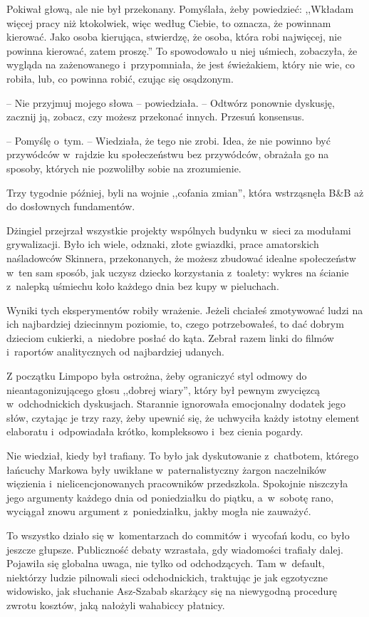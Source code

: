 \documentclass[oneside,polish,11pt,sfheadings]{mwbk}
\begin{document}
Pokiwał głową, ale nie był przekonany. Pomyślała, żeby powiedzieć:
,,Wkładam więcej pracy niż ktokolwiek, więc według Ciebie, to oznacza,
że powinnam kierować. Jako osoba kierująca, stwierdzę, że osoba, która
robi najwięcej, nie powinna kierować, zatem proszę.'' To spowodowało u
niej uśmiech, zobaczyła, że wygląda na zażenowanego i~przypomniała, że
jest świeżakiem, który nie wie, co robiła, lub, co powinna robić, czując
się osądzonym.

-- Nie przyjmuj mojego słowa -- powiedziała. -- Odtwórz ponownie dyskusję,
zacznij ją, zobacz, czy możesz przekonać innych. Przesuń konsensus.

-- Pomyślę o~tym. -- Wiedziała, że tego nie zrobi. Idea, że nie powinno
być przywódców w~rajdzie ku społeczeństwu bez przywódców, obrażała go na
sposoby, których nie pozwoliłby sobie na zrozumienie.

Trzy tygodnie później, byli na wojnie ,,cofania zmian'', która
wstrząsnęła B\&B aż do dosłownych fundamentów.

Dżingiel przejrzał wszystkie projekty wspólnych budynku w~sieci za
modułami grywalizacji. Było ich wiele, odznaki, złote gwiazdki, prace
amatorskich naśladowców Skinnera, przekonanych, że możesz zbudować
idealne społeczeństw w~ten sam sposób, jak uczysz dziecko korzystania z~toalety: wykres na ścianie z~nalepką uśmiechu koło każdego dnia bez kupy
w pieluchach.

Wyniki tych eksperymentów robiły wrażenie. Jeżeli chciałeś zmotywować
ludzi na ich najbardziej dziecinnym poziomie, to, czego potrzebowałeś,
to dać dobrym dzieciom cukierki, a~niedobre posłać do kąta. Zebrał razem
linki do filmów i~raportów analitycznych od najbardziej udanych.

Z początku Limpopo była ostrożna, żeby ograniczyć styl odmowy do
nieantagonizującego głosu ,,dobrej wiary'', który był pewnym zwycięzcą w~odchodnickich dyskusjach. Starannie ignorowała emocjonalny dodatek jego
słów, czytając je trzy razy, żeby upewnić się, że uchwyciła każdy
istotny element elaboratu i~odpowiadała krótko, kompleksowo i~bez cienia
pogardy.

Nie wiedział, kiedy był trafiany. To było jak dyskutowanie z~chatbotem,
którego łańcuchy Markowa były uwikłane w~paternalistyczny żargon
naczelników więzienia i~nielicencjonowanych pracowników przedszkola.
Spokojnie niszczyła jego argumenty każdego dnia od poniedziałku do
piątku, a~w~sobotę rano, wyciągał znowu argument z~poniedziałku, jakby
mogła nie zauważyć.

To wszystko działo się w~komentarzach do commitów i~wycofań kodu, co
było jeszcze głupsze. Publiczność debaty wzrastała, gdy wiadomości
trafiały dalej. Pojawiła się globalna uwaga, nie tylko od odchodzących.
Tam w~default, niektórzy ludzie pilnowali sieci odchodnickich, traktując
je jak egzotyczne widowisko, jak słuchanie Asz-Szabab skarżący się na
niewygodną procedurę zwrotu kosztów, jaką nałożyli wahabiccy płatnicy.
\end{document}
